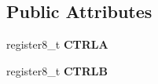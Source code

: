 \subsection*{Public Attributes}
\begin{DoxyCompactItemize}
\item 
register8\+\_\+t {\bfseries C\+T\+R\+LA}\hypertarget{struct_e_b_i___c_s__struct_ae9b29f9dbd1bea932ba733d40c53f766}{}\label{struct_e_b_i___c_s__struct_ae9b29f9dbd1bea932ba733d40c53f766}

\item 
register8\+\_\+t {\bfseries C\+T\+R\+LB}\hypertarget{struct_e_b_i___c_s__struct_aa6a952b34e3d124f9c94159f562afd46}{}\label{struct_e_b_i___c_s__struct_aa6a952b34e3d124f9c94159f562afd46}

\end{DoxyCompactItemize}


